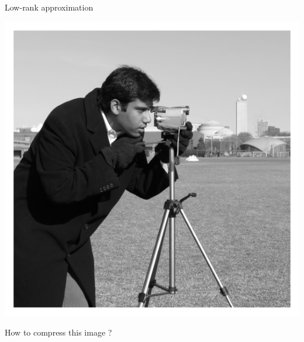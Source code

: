 \documentclass[aspectratio=169, usenames, dvipsnames]{beamer}
\begin{document}



\begin{frame}{Low-rank approximation}
  \centering

  \includegraphics[height=.75\textheight]{data/camera}

  How to compress this image ?
\end{frame}
\end{document}

